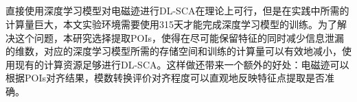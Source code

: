 {{	%
	\subsection{\yuchuli}\label{subs:selectpoi}

	直接使用深度学习模型对电磁迹进行DL-SCA在理论上可行，但是在实践中所需的计算量巨大，本文实验环境需要使用315天才能完成深度学习模型的训练。为了解决这个问题，本研究选择提取POIs，使得在尽可能保留特征的同时减少信息泄漏的维数，对应的深度学习模型所需的存储空间和训练的计算量可以有效地减小，使用现有的计算资源足够进行DL-SCA。这样做还带来一个额外的好处：电磁迹可以根据POIs对齐结果，模数转换评价对齐程度可以直观地反映特征点提取是否准确。
{	
	
%	
%	
%	
%	
%	
%		
%	
	
}}}
